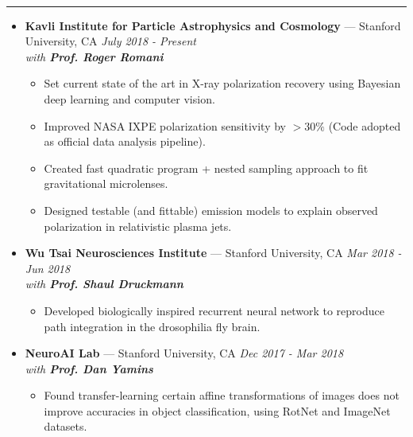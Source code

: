 \documentclass[11 pt,oneside]{article}
\newenvironment{ressection}[1]{
	\vspace{4pt}
	{\selectfont\Large\color{Mycolor2}{\textbf{#1}}}
	\vspace{-6.5pt} \\
	\textcolor{Mycolor2}{\rule{\textwidth}{0.7pt}}
	\begin{itemize}
	\vspace{3pt}
}{
	\end{itemize}
}
\newcommand{\ressubitem}{
	\vspace{-4pt}
	\item
}
\newcommand{\resbigitem}[3]{
	\vspace{-5pt}
	\item[]
	\textbf{#1} --- #2 %
	\hfill
	\textit{#3}
}
\newenvironment{ressubsec}[3]{
	\resbigitem{#1}{#2}{#3}
	\vspace{-2pt}
	\begin{itemize}
}{
	\end{itemize}
}
\begin{document}
\begin{ressection}{\textbf{Research}}

	\vspace{2pt}
	\begin{ressubsec}{Kavli Institute for Particle Astrophysics and Cosmology}{Stanford University, CA}{July 2018 - Present \\ with \textbf{Prof. Roger Romani}}
	            \ressubitem{Set current state of the art in X-ray polarization recovery using Bayesian deep learning and computer vision.}
	           \ressubitem{Improved NASA IXPE polarization sensitivity by $>30\%$ (Code adopted as official data analysis pipeline).}
	             \ressubitem{Created fast quadratic program + nested sampling approach to fit gravitational microlenses.}
                 \ressubitem{Designed testable (and fittable) emission models to explain observed polarization in relativistic plasma jets.}
	\end{ressubsec}

	\vspace{2pt}
	\begin{ressubsec}{Wu Tsai Neurosciences Institute}{Stanford University, CA}{Mar 2018 - Jun 2018 \\ with \textbf{Prof. Shaul Druckmann}}
                 \ressubitem{Developed biologically inspired recurrent neural network to reproduce path integration in the drosophilia fly brain.} 
	\end{ressubsec}

	\vspace{2pt}
	\begin{ressubsec}{NeuroAI Lab}{Stanford University, CA}{Dec 2017 - Mar 2018 \\ with \textbf{Prof. Dan Yamins}}
                 \ressubitem{Found transfer-learning certain affine transformations of images does not improve accuracies in object classification, using RotNet and ImageNet datasets.}
                 
	\end{ressubsec}
	

\end{ressection}
\end{document}
